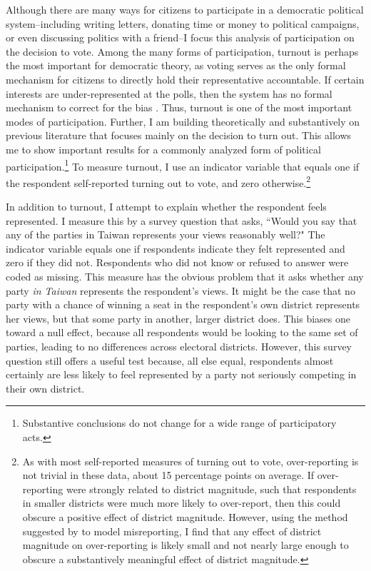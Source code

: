\documentclass[12pt]{article}
\begin{document}
Although there are many ways for citizens to participate in a democratic political system--including writing letters, donating time or money to political campaigns, or even discussing politics with a friend--I focus this analysis of participation on the decision to vote. Among the many forms of participation, turnout is perhaps the most important for democratic theory, as voting serves as the only formal mechanism for citizens to directly hold their representative accountable. If certain interests are under-represented at the polls, then the system has no formal mechanism to correct for the bias \citep{Lijphart1997, Lijphart1999}. Thus, turnout is one of the most important modes of participation. Further, I am building theoretically and substantively on previous literature that focuses mainly on the decision to turn out. This allows me to show important results for a commonly analyzed form of political participation.\footnote{Substantive conclusions do not change for a wide range of participatory acts.} To measure turnout, I use an indicator variable that equals one if the respondent self-reported turning out to vote, and zero otherwise.\footnote{As with most self-reported measures of turning out to vote, over-reporting is not trivial in these data, about 15 percentage points on average. If over-reporting were strongly related to district magnitude, such that respondents in smaller districts were much more likely to over-report, then this could obscure a positive effect of district magnitude. However, using the method suggested by \cite{Wright1993} to model misreporting, I find that any effect of district magnitude on over-reporting is likely small and not nearly large enough to obscure a substantively meaningful effect of district magnitude.}

In addition to turnout, I attempt to explain whether the respondent feels represented. I measure this by a survey question that asks, ``Would you say that any of the parties in Taiwan represents your views reasonably well?" The indicator variable equals one if respondents indicate they felt represented and zero if they did not. Respondents who did not know or refused to answer were coded as missing. This measure has the obvious problem that it asks whether any party \textit{in Taiwan} represents the respondent's views. It might be the case that no party with a chance of winning a seat in the respondent's own district represents her views, but that some party in another, larger district does. This biases one toward a null effect, because all respondents would be looking to the same set of parties, leading to no differences across electoral districts. However, this survey question still offers a useful test because, all else equal, respondents almost certainly are less likely to feel represented by a party not seriously competing in their own district.
\end{document}
